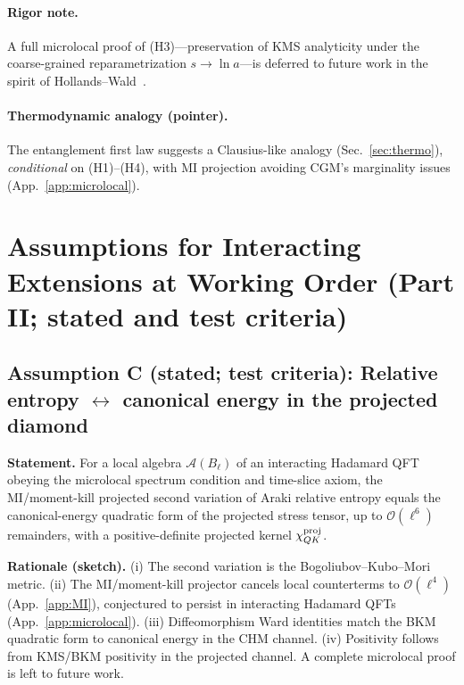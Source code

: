 \documentclass[aps,prd,onecolumn,superscriptaddress,nofootinbib]{revtex4-2}
\begin{document}
\paragraph{Rigor note.}
A full microlocal proof of (H3)—preservation of KMS analyticity under the coarse-grained reparametrization \(s\!\to\!\ln a\)—is deferred to future work in the spirit of Hollands–Wald~\cite{HollandsWald2001}.

\paragraph{Thermodynamic analogy (pointer).}
The entanglement first law suggests a Clausius-like analogy (Sec.~\ref{sec:thermo}), \emph{conditional} on (H1)–(H4), with MI projection avoiding CGM’s marginality issues (App.~\ref{app:microlocal}).

\section{Assumptions for Interacting Extensions at Working Order (Part II; stated and test criteria)}
\label{sec:proofs}

\subsection{Assumption C (stated; test criteria): Relative entropy \texorpdfstring{$\leftrightarrow$}{<->} canonical energy in the projected diamond}
\label{sec:lemmaC}

\noindent\textbf{Statement.} For a local algebra \(\mathcal A(B_\ell)\) of an interacting Hadamard QFT obeying the microlocal spectrum condition and time-slice axiom, the MI/moment-kill projected second variation of Araki relative entropy equals the canonical-energy quadratic form of the projected stress tensor, up to \(\mathcal O(\ell^6)\) remainders, with a positive-definite projected kernel \(\chi_{QK}^{\rm proj}\).

\smallskip
\noindent\textbf{Rationale (sketch).} (i) The second variation is the Bogoliubov–Kubo–Mori metric. (ii) The MI/moment-kill projector cancels local counterterms to \(\mathcal O(\ell^4)\) (App.~\ref{app:MI}), conjectured to persist in interacting Hadamard QFTs (App.~\ref{app:microlocal}). (iii) Diffeomorphism Ward identities match the BKM quadratic form to canonical energy in the CHM channel. (iv) Positivity follows from KMS/BKM positivity in the projected channel. A complete microlocal proof is left to future work.
\end{document}
